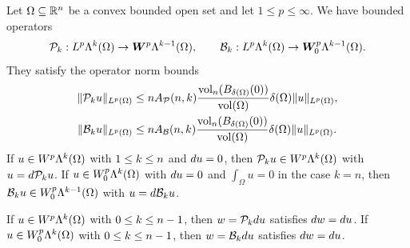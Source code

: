 \documentclass[10pt,a4paper]{article}
\newcommand{\todo}[1]{{\colorbox{yellow}{#1}}}
\newcommand{\mwl}[1]{{\color{red}#1}}
\begin{document}
\begin{theorem}\label{theorem:PF_EC}
    Let $\Omega \subseteq {\mathbb R}^{n}$ be a convex bounded open set and let $1 \leq p \leq \infty$. 
    We have bounded operators 
    \begin{align*}
        {\mathcal P}_{k} : L^{p}\Lambda^{k}(\Omega) \rightarrow \bm{W}^{p}\Lambda^{k-1}(\Omega)
        ,
        \qquad 
        {\mathcal B}_{k} : L^{p}\Lambda^{k}(\Omega) \rightarrow \bm{W}^{p}_{0}\Lambda^{k-1}(\Omega)
        .
    \end{align*}
    They satisfy the operator norm bounds 
    \begin{align*}
        \| {\mathcal P}_{k} u \|_{L^{p}(\Omega)}
        &\leq 
        n A_{{\mathcal P}}(n,k) \frac{ \operatorname{vol}_{n}(B_{{\delta}(\Omega)}(0)) }{\operatorname{vol}(\Omega)} 
        {\delta}(\Omega)
        \| u \|_{L^{p}(\Omega)}
        ,
        \\
        \| {\mathcal B}_{k} u \|_{L^{p}(\Omega)}
        &\leq 
        n A_{{\mathcal B}}(n,k) \frac{ \operatorname{vol}_{n}(B_{{\delta}(\Omega)}(0)) }{\operatorname{vol}(\Omega)} 
        {\delta}(\Omega)
        \| u \|_{L^{p}(\Omega)}
        .
    \end{align*}
    If $u \in W^{p}    \Lambda^{k}(\Omega)$ with $1 \leq k \leq n$ and $d u = 0$, 
    then ${\mathcal P}_{k} u \in W^{p}    \Lambda^{k  }(\Omega)$ with $u = d {\mathcal P}_{k} u$.
    If $u \in W^{p}_{0}\Lambda^{k}(\Omega)$ with $d u = 0$ and $\int_\Omega u = 0$ in the case $k=n$, 
    then ${\mathcal B}_{k} u \in W^{p}_{0}\Lambda^{k-1}(\Omega)$ with $u = d {\mathcal B}_{k} u$.
    
    \mwl{
    If $u \in W^{p}    \Lambda^{k}(\Omega)$ with $0 \leq k \leq n-1$, then $w = {\mathcal P}_{k} d u$ satisfies $d w = d u$.
    If $u \in W^{p}_{0}\Lambda^{k}(\Omega)$ with $0 \leq k \leq n-1$, then $w = {\mathcal B}_{k} d u$ satisfies $d w = d u$.
    }
\end{theorem}

\end{document}
